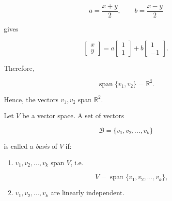 \begin{example}
	\begin{equation}
		a=\frac{x+y}{2},
		\qquad
		b=\frac{x-y}{2}
		\label{eq:basis-and-dimension-of-r-12}
	\end{equation}

	gives

	\begin{equation}
		\begin{bmatrix}
			x \\y
		\end{bmatrix}
		=
		a
		\begin{bmatrix}
			1 \\1
		\end{bmatrix}
		+
		b
		\begin{bmatrix}
			1 \\-1
		\end{bmatrix}.
		\label{eq:basis-and-dimension-of-r-13}
	\end{equation}

	Therefore,

	\begin{equation}
		\operatorname{span}\{v_1,v_2\}=\mathbb{R}^2.
		\label{eq:basis-and-dimension-of-r-14}
	\end{equation}

	Hence, the vectors \(v_1,v_2\) span \(\mathbb{R}^2\).
\end{example}

\begin{definition}[Basis]
	Let \(V\) be a vector space. A set of vectors

	\begin{equation}
		\mathcal{B}=\{v_1,v_2,\dots,v_k\}
		\label{eq:basis-1}
	\end{equation}

	is called a \emph{basis} of \(V\) if:

	\begin{enumerate}
		\item \(v_1,v_2,\dots,v_k\) span \(V\), i.e.

		      \begin{equation}
			      V=\operatorname{span}\{v_1,v_2,\dots,v_k\},
			      \label{eq:basis-2}
		      \end{equation}


		\item \(v_1,v_2,\dots,v_k\) are linearly independent.
	\end{enumerate}

\end{definition}

